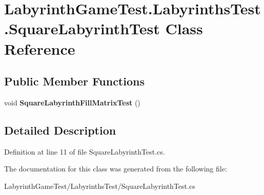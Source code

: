 \hypertarget{class_labyrinth_game_test_1_1_labyrinths_test_1_1_square_labyrinth_test}{\section{Labyrinth\+Game\+Test.\+Labyrinths\+Test.\+Square\+Labyrinth\+Test Class Reference}
\label{class_labyrinth_game_test_1_1_labyrinths_test_1_1_square_labyrinth_test}
}
\subsection*{Public Member Functions}
\begin{DoxyCompactItemize}
\item 
\hypertarget{class_labyrinth_game_test_1_1_labyrinths_test_1_1_square_labyrinth_test_ab0c07f4be70124c3a64a70bbed3c75c2}{void {\bfseries Square\+Labyrinth\+Fill\+Matrix\+Test} ()}\label{class_labyrinth_game_test_1_1_labyrinths_test_1_1_square_labyrinth_test_ab0c07f4be70124c3a64a70bbed3c75c2}

\end{DoxyCompactItemize}


\subsection{Detailed Description}


Definition at line 11 of file Square\+Labyrinth\+Test.\+cs.



The documentation for this class was generated from the following file\+:\begin{DoxyCompactItemize}
\item 
Labyrinth\+Game\+Test/\+Labyrinths\+Test/Square\+Labyrinth\+Test.\+cs\end{DoxyCompactItemize}
